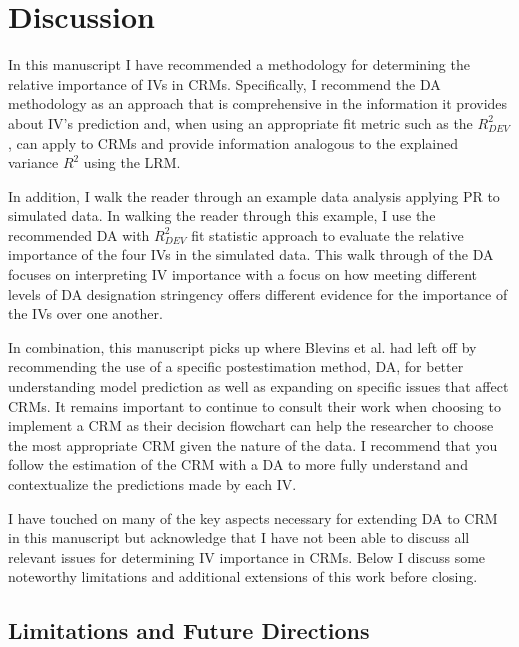 \documentclass[man]{apa7}
\begin{document}
\section{Discussion}

	In this manuscript I have recommended a methodology for determining the relative importance of IVs in CRMs.
	Specifically, I recommend the DA methodology as an approach that is comprehensive in the information it provides about IV's prediction and, when using an appropriate fit metric such as the $R^2_{DEV}$, can apply to CRMs and provide information analogous to the explained variance $R^2$ using the LRM.
	
	In addition, I walk the reader through an example data analysis applying PR to simulated data. 
	In walking the reader through this example, I use the recommended DA with $R^2_{DEV}$ fit statistic approach to evaluate the relative importance of the four IVs in the simulated data.
	This walk through of the DA focuses on interpreting IV importance with a focus on how meeting different levels of DA designation stringency offers different evidence for the importance of the IVs over one another.
	
	In combination, this manuscript picks up where Blevins et al. \parencite*{blevins2015count} had left off by recommending the use of a specific postestimation method, DA, for better understanding model prediction as well as expanding on specific issues that affect CRMs.
	It remains important to continue to consult their work when choosing to implement a CRM as their decision flowchart can help the researcher to choose the most appropriate CRM given the nature of the data.
	I recommend that you follow the estimation of the CRM with a DA to more fully understand and contextualize the predictions made by each IV.
	
	I have touched on many of the key aspects necessary for extending DA to CRM in this manuscript but acknowledge that I have not been able to discuss all relevant issues for determining IV importance in CRMs.
	Below I discuss some noteworthy limitations and additional extensions of this work before closing.
	
	\subsection{Limitations and Future Directions}
	
\end{document}
